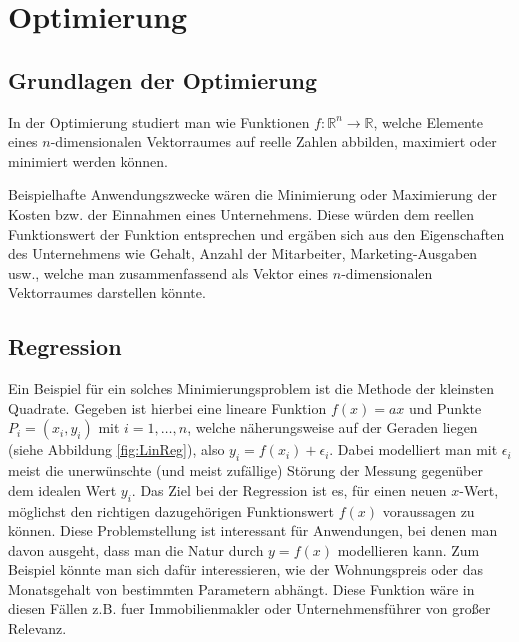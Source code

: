 \section{Optimierung}
\subsection{Grundlagen der Optimierung}
In der Optimierung studiert man wie Funktionen $f: \mathbb{R}^n \rightarrow \mathbb{R}$, welche Elemente eines $n$-dimensionalen Vektorraumes auf reelle Zahlen abbilden, maximiert oder minimiert werden können.

Beispielhafte Anwendungszwecke wären die Minimierung oder Maximierung der Kosten bzw. der Einnahmen eines Unternehmens. Diese würden dem reellen Funktionswert der Funktion entsprechen und ergäben sich aus den Eigenschaften des Unternehmens wie Gehalt, Anzahl der Mitarbeiter, Marketing-Ausgaben usw., welche man zusammenfassend als Vektor eines $n$-dimensionalen Vektorraumes darstellen könnte.

\subsection{Regression}
\label{sec:regression}
Ein Beispiel für ein solches Minimierungsproblem ist die Methode der kleinsten Quadrate. Gegeben ist hierbei eine lineare Funktion $f(x) = ax$ und Punkte $P_i=(x_i,y_i)$ mit $i=1,\dots,n$, welche näherungsweise auf der Geraden liegen (siehe Abbildung \ref{fig:LinReg}), also $y_i = f(x_i) + \epsilon_{i}$. Dabei modelliert man mit $\epsilon_i$ meist die unerw\"unschte (und meist zuf\"allige) St\"orung der Messung gegen\"uber dem idealen Wert $y_i$. Das Ziel bei der Regression ist es, f\"ur einen neuen $x$-Wert, m\"oglichst den richtigen dazugeh\"origen Funktionswert $f(x)$ voraussagen zu k\"onnen. Diese Problemstellung ist interessant f\"ur Anwendungen, bei denen man davon ausgeht, dass man die Natur durch $y = f(x)$ modellieren kann. Zum Beispiel k\"onnte man sich daf\"ur interessieren, wie der Wohnungspreis oder das Monatsgehalt von bestimmten Parametern abh\"angt. Diese Funktion w\"are in diesen F\"allen z.B. fuer Immobilienmakler oder Unternehmensf\"uhrer von gro\ss er Relevanz. 


